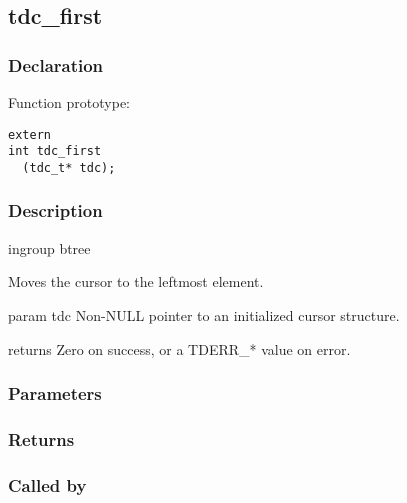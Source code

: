 
\newpage
\subsection{tdc\_first}
\subsubsection{Declaration} Function prototype:

\begin{verbatim}
extern
int tdc_first
  (tdc_t* tdc);
\end{verbatim}

\subsubsection{Description}


 ingroup btree

 Moves the cursor to the leftmost element.

 param tdc Non-NULL pointer to an initialized cursor structure.

 returns Zero on success, or a TDERR\_* value on error.
 

\subsubsection{Parameters}
\subsubsection{Returns}
\subsubsection{Called by}
